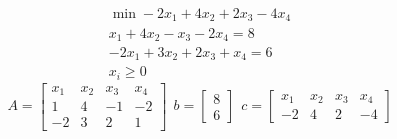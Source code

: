 \Es
\begin{gather*}
\min -2x_{1} +4x_{2} +2x_{3} -4x_{4}\\
x_{1} +4x_{2} -x_{3} -2x_{4} =8\\
-2x_{1} +3x_{2} +2x_{3} +x_{4} =6\\
x_{i} \geq 0
\end{gather*}
\begin{equation*}
A=\begin{bmatrix}
x_{1} & x_{2} & x_{3} & x_{4}\\
1 & 4 & -1 & -2\\
-2 & 3 & 2 & 1
\end{bmatrix} \ \ b=\begin{bmatrix}
8\\
6
\end{bmatrix} \ \ c=\begin{bmatrix}
x_{1} & x_{2} & x_{3} & x_{4}\\
-2 & 4 & 2 & -4
\end{bmatrix}
\end{equation*}

